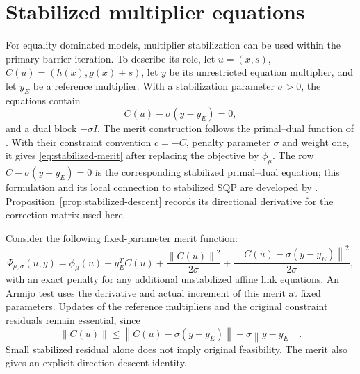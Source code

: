 \documentclass[pdflatex,sn-mathphys-num]{sn-jnl}
\theoremstyle{thmstyleone}
\theoremstyle{thmstylethree}
\newcommand{\norm}[1]{\left\lVert#1\right\rVert}
\begin{document}
\section{Stabilized multiplier equations}\label{supp:stabilized}
For equality dominated models, multiplier stabilization can be used
within the primary barrier iteration. To describe its role, let
$u=(x,s)$, $C(u)=(h(x),g(x)+s)$, let $y$ be its unrestricted equation
multiplier, and let $y_E$ be a reference multiplier. With a stabilization
parameter $\sigma>0$, the equations contain
\begin{equation}\label{eq:stabilized-eq}
 C(u)-\sigma(y-y_E)=0,
\end{equation}
and a dual block $-\sigma I$.
The merit construction follows the primal--dual function of
\citet{GillRobinson2012}. With their constraint convention $c=-C$,
penalty parameter $\sigma$ and weight one, it gives
\eqref{eq:stabilized-merit} after replacing the objective by
$\phi_\mu$. The row $C-\sigma(y-y_E)=0$ is the corresponding
stabilized primal--dual equation; this formulation and its local
connection to stabilized SQP are developed by
\citet{GillKungurtsevRobinson2017Global,GillKungurtsevRobinson2017Local}.
Proposition~\ref{prop:stabilized-descent} records its directional
derivative for the correction matrix used here.

Consider the following fixed-parameter merit function:
\begin{equation}\label{eq:stabilized-merit}
 \Psi_{\mu,\sigma}(u,y)=\phi_\mu(u)+y_E^TC(u)
 +\frac{\norm{C(u)}^2}{2\sigma}
 +\frac{\norm{C(u)-\sigma(y-y_E)}^2}{2\sigma},
\end{equation}
with an exact penalty for any additional unstabilized affine link
equations. An Armijo test uses the derivative and actual increment of
this merit at fixed parameters. Updates of the reference multipliers and
the original constraint residuals remain essential, since
\[
 \norm{C(u)}\leq\norm{C(u)-\sigma(y-y_E)}
                       +\sigma\norm{y-y_E}.
\]
Small stabilized residual alone does not imply original feasibility.
The merit also gives an explicit direction-descent identity.
\end{document}

